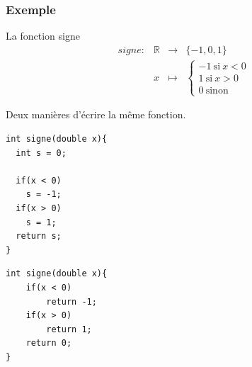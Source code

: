\begin{frame}
\begin{center}
    \end{center}

\end{frame}

\begin{frame}[fragile]
\frametitle{Exemple}

\begin{block}{La fonction signe}
$$
\begin{array}{cccc}
signe: & \mathbb{R} & \to & \{-1,0,1\} \\
& x & \mapsto & \left\{
    \begin{split}
    -1 \: \text{si} \: x < 0\\
    1 \: \text{si}  \: x > 0\\
    0 \: \text{sinon}
    \end{split}
  \right.
\end{array}
$$
\end{block}
Deux manières d'écrire la même fonction.
\begin{minipage}{0.47\linewidth}
\begin{verbatim}
int signe(double x){
  int s = 0;
	  
  if(x < 0)
    s = -1;
  if(x > 0)
    s = 1;
  return s;
}
\end{verbatim}
\end{minipage}
\hfill
\begin{minipage}{0.47\linewidth}
\begin{verbatim}
int signe(double x){
    if(x < 0)
        return -1;
    if(x > 0)
        return 1;
    return 0;
}
\end{verbatim}
\end{minipage}
\end{frame}


